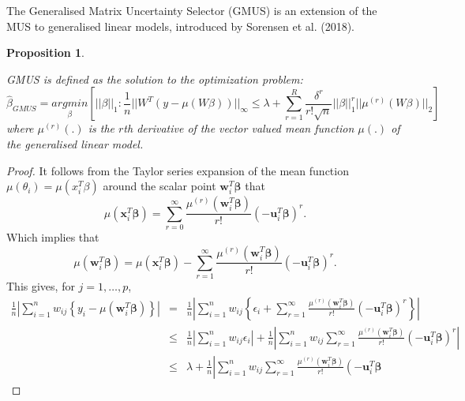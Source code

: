\documentclass[a4paper,12pt,openany]{report}
\theoremstyle{plain}
\theoremstyle{plain}
\newtheorem{proposition}{\textbf{Proposition}}[section]
\theoremstyle{plain}
\theoremstyle{plain}
\theoremstyle{plain}
\theoremstyle{plain}
\theoremstyle{plain}
\theoremstyle{plain}
\theoremstyle{plain}
\theoremstyle{plain}
\theoremstyle{plain}
\theoremstyle{plain}
\begin{document}
The Generalised Matrix Uncertainty Selector (GMUS) is an extension of the MUS to generalised linear models, introduced by Sorensen et al. (2018). 
\begin{proposition}\label{prop31}
	
GMUS is defined as the solution to the optimization problem:
\begin{equation}\label{eq:boundGMUS}
\hat{\beta}_{GMUS} = \underset{\beta}{argmin}\left[||\beta||_1 :  \frac{1}{n}||W^T(y-\mu(W\beta))||_{\infty} \leq \lambda + \sum_{r=1}^{R}\frac{\delta^r}{r!\sqrt{n}}||\beta||_{1}^{r}||\mu^{(r)}(W\beta)||_2\right] 
\end{equation}
where $\mu^{(r)}(.)$ is the $r$th derivative of the vector valued mean function $\mu(.)$ of the generalised linear model.
\end{proposition}
\begin{proof}
	It follows from the Taylor series expansion of the mean function $\mu(\theta_i)=\mu(x_i^T\beta)$ around the scalar point $\mathbf{w}_i^T\boldsymbol{\beta}$ that
	\begin{equation*}
	\mu\left(\mathbf{x}_{i}^{T}\boldsymbol{\beta}\right) =  \sum_{r=0}^{\infty} \frac{\mu^{(r)}\left( \mathbf{w}_{i}^{T}\boldsymbol{\beta}\right)}{r!} \left(-\mathbf{u}_{i}^{T}\boldsymbol{\beta}\right)^{r}.
	\end{equation*}
	Which implies that
	\begin{equation*}
	\mu\left(\mathbf{w}_{i}^{T}\boldsymbol{\beta}\right) = \mu\left(\mathbf{x}_{i}^{T}\boldsymbol{\beta}\right) - \sum_{r=1}^{\infty} \frac{\mu^{(r)}\left( \mathbf{w}_{i}^{T}\boldsymbol{\beta}\right)}{r!} \left(-\mathbf{u}_{i}^{T}\boldsymbol{\beta}\right)^{r}.
	\end{equation*}
	This gives, for $j=1,\dots,p$,
	\begin{align*}
	\frac{1}{n}\left|\sum_{i=1}^{n} w_{ij}\left\{y_{i} - \mu\left(\mathbf{w}_{i}^{T}\boldsymbol{\beta} \right) \right\} \right| &=& 
	 \frac{1}{n}\left|\sum_{i=1}^{n} w_{ij}\left\{\epsilon_{i}+ \sum_{r=1}^{\infty} \frac{\mu^{(r)}\left( \mathbf{w}_{i}^{T}\boldsymbol{\beta}\right)}{r!} \left(-\mathbf{u}_{i}^{T}\boldsymbol{\beta}\right)^{r}\right\} \right| \\
	 &\leq&
	 \frac{1}{n}\left|\sum_{i=1}^{n} w_{ij}\epsilon_{i} \right| + \frac{1}{n}\left|\sum_{i=1}^{n} w_{ij} \sum_{r=1}^{\infty} \frac{\mu^{(r)}\left( \mathbf{w}_{i}^{T}\boldsymbol{\beta}\right)}{r!} \left(-\mathbf{u}_{i}^{T}\boldsymbol{\beta}\right)^{r} \right|\\
	 & \leq& 
	 \lambda + \frac{1}{n}\left|\sum_{i=1}^{n} w_{ij} \sum_{r=1}^{\infty} \frac{\mu^{(r)}\left( \mathbf{w}_{i}^{T}\boldsymbol{\beta}\right)}{r!} \left(-\mathbf{u}_{i}^{T}\boldsymbol{\beta}

\end{align*}
\end{proof}
\end{document}
